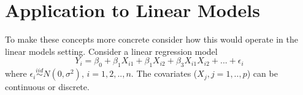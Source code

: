 \documentclass[12pt]{article}
\begin{document}
%


%
%
%

\section{Application to Linear Models} \label{sec:regression}

To make these concepts more concrete consider how this would operate in the linear models setting. Consider a linear regression model 
\begin{equation}\label{multi} Y_i = \beta_0 + \beta_1 X_{i1} + \beta_1 X_{i2} + \beta_3 X_{i1}X_{i2} + ... + \epsilon_i 
\end{equation}
where $\epsilon_i \stackrel{iid}{ \sim } N(0,\sigma^2)$, $i=1,2, .., n$. The covariates ($X_j, j=1,..,p$) can be continuous or discrete.
\end{document}
